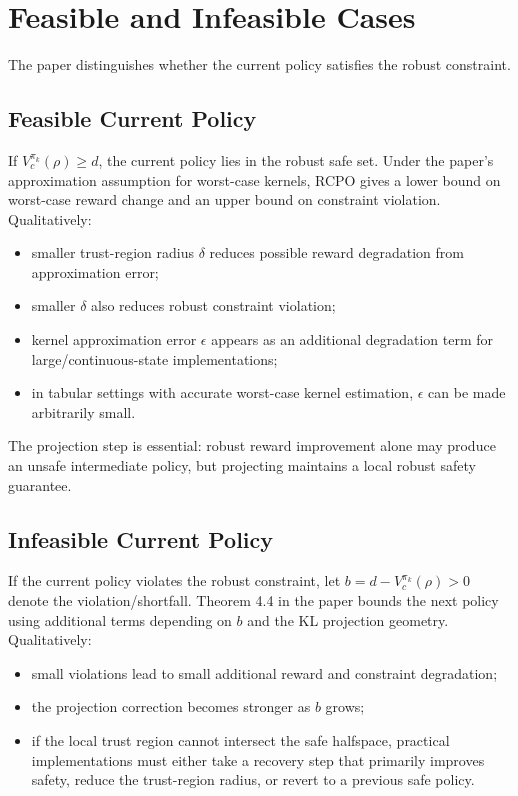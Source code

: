 \documentclass[11pt]{article}
\begin{document}
\section{Feasible and Infeasible Cases}
The paper distinguishes whether the current policy satisfies the robust constraint.

\subsection{Feasible Current Policy}
If $V_c^{\pi_k}(\rho)\ge d$, the current policy lies in the robust safe set.  Under the paper's approximation assumption for worst-case kernels, RCPO gives a lower bound on worst-case reward change and an upper bound on constraint violation.  Qualitatively:
\begin{itemize}[leftmargin=2em]
    \item smaller trust-region radius $\delta$ reduces possible reward degradation from approximation error;
    \item smaller $\delta$ also reduces robust constraint violation;
    \item kernel approximation error $\epsilon$ appears as an additional degradation term for large/continuous-state implementations;
    \item in tabular settings with accurate worst-case kernel estimation, $\epsilon$ can be made arbitrarily small.
\end{itemize}
The projection step is essential: robust reward improvement alone may produce an unsafe intermediate policy, but projecting maintains a local robust safety guarantee.

\subsection{Infeasible Current Policy}
If the current policy violates the robust constraint, let $b=d-V_c^{\pi_k}(\rho)>0$ denote the violation/shortfall.  Theorem 4.4 in the paper bounds the next policy using additional terms depending on $b$ and the KL projection geometry.  Qualitatively:
\begin{itemize}[leftmargin=2em]
    \item small violations lead to small additional reward and constraint degradation;
    \item the projection correction becomes stronger as $b$ grows;
    \item if the local trust region cannot intersect the safe halfspace, practical implementations must either take a recovery step that primarily improves safety, reduce the trust-region radius, or revert to a previous safe policy.
\end{itemize}
\end{document}
